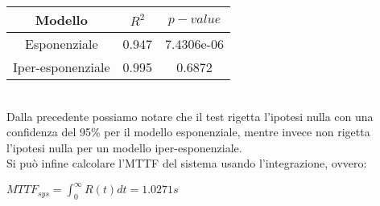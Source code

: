 \begin{table}[htbp]
    \centering
    \label{tab:esempio}
    \begin{tabular}{|c|c|c|} %
        \hline
        Modello & $R^2$ & $p-value$ \\ %
        \hline
        Esponenziale & 0.947 &  7.4306e-06\\
        Iper-esponenziale & 0.995 &  0.6872\\
        \hline
    \end{tabular}
\end{table}\\
\noindent
Dalla precedente possiamo notare che il test rigetta l'ipotesi nulla con una confidenza del 95\% per il modello esponenziale, mentre invece non rigetta l'ipotesi nulla per un modello iper-esponenziale.\\
Si può infine calcolare l'MTTF del sistema usando l'integrazione, ovvero:
\begin{center}
$MTTF_{sys} = \int_{0}^{\infty} R(t) dt = 1.0271s$
\end{center}

